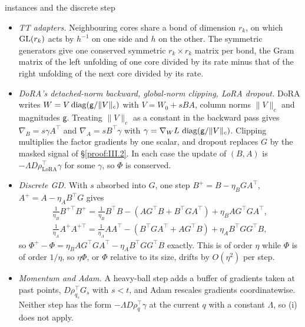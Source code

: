 \begin{remark*}{instances and the discrete step}
\begin{itemize}
$c>0$ and column $j$ of $U$ by $1/c$ preserves the function, since $\operatorname{relu}(cz)=c\operatorname{relu}(z)$. The
target is a function space, which  allows, and the derivative of $\rho$ along the scaling
direction vanishes by homogeneity even at the kinks. Each hidden unit gives the charge
$\tfrac12\big((\lVert D_{j,:}\rVert^2+\beta_j^2)/\eta_D-\lVert U_{:,j}\rVert^2/\eta_U\big)$, with a common rate for $D$
and $\beta$.
\item \emph{TT adapters.} Neighbouring cores share a bond of dimension $r_k$, on which $\mathrm{GL}(r_k)$ acts by $h^{-1}$ on one
side and $h$ on the other. The symmetric generators give one conserved symmetric $r_k\times r_k$ matrix per bond, the
Gram matrix of the left unfolding of one core divided by its rate minus that of the right unfolding of the next core
divided by its rate.
\item \emph{DoRA's detached-norm backward, global-norm clipping, LoRA dropout.} DoRA writes $W=V\operatorname{diag}(\mathsf g/\lVert V\rVert_c)$
with $V=W_0+sBA$, column norms $\lVert V\rVert_c$ and magnitudes $\mathsf g$. Treating $\lVert V\rVert_c$ as a constant in
the backward pass gives $\nabla_B=s\gamma A^\top$ and $\nabla_A=sB^\top\gamma$ with
$\gamma=\nabla_WL\,\operatorname{diag}(\mathsf g/\lVert V\rVert_c)$. Clipping multiplies the factor gradients by one scalar, and dropout
replaces $G$ by the masked signal of \S\ref{proof:III.2}. In each case the update of $(B,A)$ is
$-\Lambda D\rho_{\mathrm{LoRA}}^\top\gamma$ for some $\gamma$, so $\Phi$ is conserved.
\item \emph{Discrete GD.} With $s$ absorbed into $G$, one step $B^+=B-\eta_BGA^\top$, $A^+=A-\eta_AB^\top G$ gives
\begin{gather*}
\tfrac{1}{\eta_B}B^{+\top}B^+=\tfrac{1}{\eta_B}B^\top B-(AG^\top B+B^\top GA^\top)+\eta_BAG^\top GA^\top,\\
\tfrac{1}{\eta_A}A^+A^{+\top}=\tfrac{1}{\eta_A}AA^\top-(B^\top GA^\top+AG^\top B)+\eta_AB^\top GG^\top B,
\end{gather*}
so $\Phi^+-\Phi=\eta_BAG^\top GA^\top-\eta_AB^\top GG^\top B$ exactly. This is of order $\eta$ while $\Phi$ is of order
$1/\eta$, so $\eta\Phi$, or $\Phi$ relative to its size, drifts by $O(\eta^2)$ per step.
\item \emph{Momentum and Adam.} A heavy-ball step adds a buffer of gradients taken at past points, $D\rho_{q_s}^\top G_s$
with $s<t$, and Adam rescales gradients coordinatewise. Neither step has the form $-\Lambda D\rho_q^\top\gamma$ at the
current $q$ with a constant $\Lambda$, so (i) does not apply.
\end{itemize}
\end{remark*}

